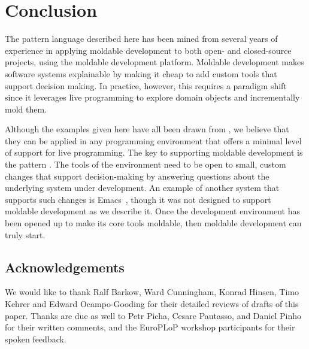 \documentclass[sigconf,screen]{acmart}
\newcommand\ws[1]{\nbe{Workshop}{#1}{teal}} %
\newcommand{\GT}{\lst{GT}\xspace} %
\newcommand{\patref}[1]{\emph{\nameref{pat:#1}}\xspace}
\begin{document}
\section{Conclusion}


The pattern language described here has been mined from several years of experience in applying moldable development to both open- and closed-source projects, using the \GT moldable development platform.
Moldable development makes software systems explainable by making it cheap to add custom tools that support decision making.
In practice, however, this requires a paradigm shift since it leverages live programming to explore domain objects and incrementally mold them.

Although the examples given here have all been drawn from \GT, we believe that they can be applied in any programming environment that offers a minimal level of support for live programming.
The key to supporting moldable development is the pattern \patref{MoldableTool}.
The tools of the environment need to be open to small, custom changes that support decision-making by answering questions about the underlying system under development.
An example of another system that supports such changes is Emacs~\cite{Stal81a}, though it was not designed to support moldable development as we describe it.
Once the development environment has been opened up to make its core tools moldable, then moldable development can truly start.

\subsection*{Acknowledgements}
We would like to thank Ralf Barkow, Ward Cunningham, Konrad Hinsen, Timo Kehrer and Edward Ocampo-Gooding for their detailed reviews of drafts of this paper.
Thanks are due as well to Petr Picha, Cesare Pautasso, and Daniel Pinho for their written comments, and the EuroPLoP workshop participants for their spoken feedback.



\end{document}
